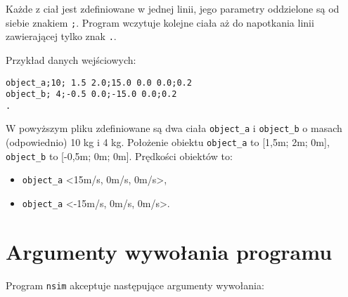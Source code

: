 \documentclass[]{article}
\begin{document}
Każde z ciał jest zdefiniowane w jednej linii, jego parametry oddzielone
są od siebie znakiem \texttt{;}. Program wczytuje kolejne ciała aż do
napotkania linii zawierającej tylko znak \texttt{.}.

Przykład danych wejściowych:

\begin{verbatim}
object_a;10; 1.5 2.0;15.0 0.0 0.0;0.2
object_b; 4;-0.5 0.0;-15.0 0.0;0.2
.
\end{verbatim}

W powyższym pliku zdefiniowane są dwa ciała \texttt{object\_a} i
\texttt{object\_b} o masach (odpowiednio) 10 kg i 4 kg. Położenie
obiektu \texttt{object\_a} to {[}1,5m; 2m; 0m{]}, \texttt{object\_b} to
{[}-0,5m; 0m; 0m{]}. Prędkości obiektów to:

\begin{itemize}
\item
  \texttt{object\_a} \textless{}15m/s, 0m/s, 0m/s\textgreater{},
\item
  \texttt{object\_a} \textless{}-15m/s, 0m/s, 0m/s\textgreater{}.
\end{itemize}

\section{Argumenty wywołania programu}\label{header-n256}

Program \texttt{nsim} akceptuje następujące argumenty wywołania:
\end{document}
